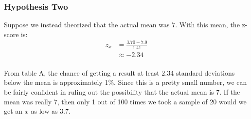 \documentclass[landscape]{exam}
\begin{document}
  \subsubsection{Hypothesis Two}
  Suppose we instead theorized that the actual mean was 7. With this mean, the
  z-score is:
  \begin{align*}
    z_{\bar{x}} & = \frac{3.70 - 7.0}{1.41} \\
                & \approx -2.34 \\
  \end{align*}

  From table A, the chance of getting a result at least $2.34$ standard
  deviations below the mean is approximately 1\%. Since this is a pretty small
  number, we can be fairly confident in ruling out the possibility that the
  actual mean is 7. If the mean was really 7, then only 1 out of 100 times we
  took a sample of 20 would we get an $\bar{x}$ as low as 3.7.
\end{document}
